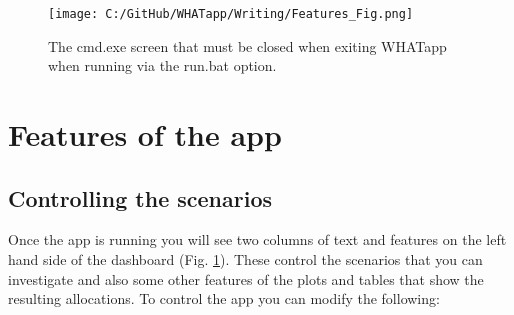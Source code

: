 \documentclass[11pt]{article}
\begin{document}
 \begin{figure} [h]
  \centering
\texttt{[image: C:/GitHub/WHATapp/Writing/Features\_Fig.png]}
  \caption {The cmd.exe screen that must be closed when exiting WHATapp when running via the run.bat option.}
  \label{fig:featpg}
\end{figure}




\section{Features of the app}

\subsection{Controlling the scenarios}
Once the app is running you will see two columns of text and features on the left hand side of the dashboard (Fig. \ref{fig:featpg}). These control the scenarios that you can investigate and also some other features of the plots and tables that show the resulting allocations. To control the app you can modify the following:
\end{document}
